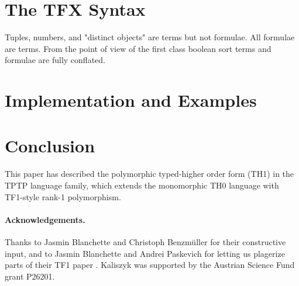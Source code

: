 \documentclass{easychair}
\begin{document}
\section{The TFX Syntax}
\label{TFX}

Tuples, numbers, and "distinct objects" are terms but not formulae.
All formulae are terms.  
From the point of view of the first class boolean sort terms and formulae 
are fully conflated.

\section{Implementation and Examples}
\label{ImplementationExamples}

\section{Conclusion}
\label{Conclusion}

This paper has described the polymorphic typed-higher order form (TH1)
in the TPTP language family, which extends the monomorphic TH0 language
with TF1-style rank-1 polymorphism.

\paragraph{Acknowledgements.}
Thanks to Jasmin Blanchette and Christoph Benzm{\"u}ller for their
constructive input, and to Jasmin Blanchette and Andrei Paskevich for
letting us plagerize parts of their TF1 paper \cite{BP13-TFF1}.
Kaliszyk was supported by the Austrian Science Fund grant P26201.



\end{document}
